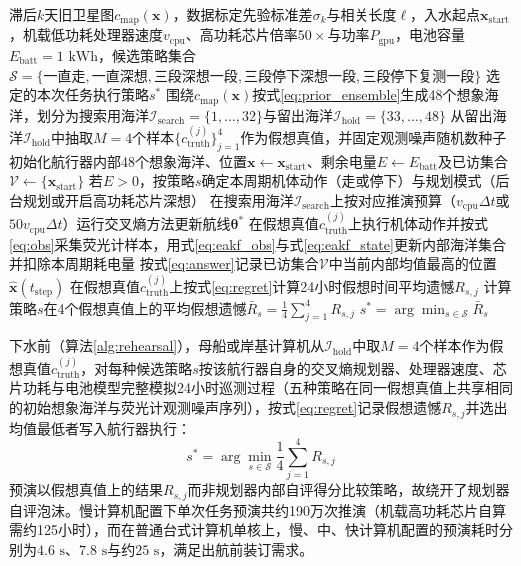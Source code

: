 \begin{algorithm}[htbp]
  \caption{基于数据标定留出想象海洋的出发前全任务预演}
  \label{alg:rehearsal}
  \begin{algorithmic}[1]
    \Require 滞后$k$天旧卫星图$c_{\text{map}}(\mathbf{x})$，数据标定先验标准差$\sigma_k$与相关长度$\ell$，入水起点$\mathbf{x}_{\text{start}}$，机载低功耗处理器速度$v_{\text{cpu}}$、高功耗芯片倍率$50\times$与功率$P_{\text{gpu}}$，电池容量$E_{\text{batt}}=1\text{ kWh}$，候选策略集合$\mathcal{S}=\{\text{一直走}, \text{一直深想}, \text{三段深想一段}, \text{三段停下深想一段}, \text{三段停下复测一段}\}$
    \Ensure 选定的本次任务执行策略$s^*$
    \State 围绕$c_{\text{map}}(\mathbf{x})$按式\eqref{eq:prior_ensemble}生成48个想象海洋，划分为搜索用海洋$\mathcal{I}_{\text{search}}=\{1,\dots,32\}$与留出海洋$\mathcal{I}_{\text{hold}}=\{33,\dots,48\}$
    \State 从留出海洋$\mathcal{I}_{\text{hold}}$中抽取$M=4$个样本$\{c_{\text{truth}}^{(j)}\}_{j=1}^4$作为假想真值，并固定观测噪声随机数种子
        \State 初始化航行器内部48个想象海洋、位置$\mathbf{x} \leftarrow \mathbf{x}_{\text{start}}$、剩余电量$E \leftarrow E_{\text{batt}}$及已访集合$\mathcal{V} \leftarrow \{\mathbf{x}_{\text{start}}\}$
          \State 若$E > 0$，按策略$s$确定本周期机体动作（走或停下）与规划模式（后台规划或开启高功耗芯片深想）
          \State 在搜索用海洋$\mathcal{I}_{\text{search}}$上按对应推演预算（$v_{\text{cpu}}\Delta t$或$50 v_{\text{cpu}}\Delta t$）运行交叉熵方法更新航线$\bm{\theta}^*$
          \State 在假想真值$c_{\text{truth}}^{(j)}$上执行机体动作并按式\eqref{eq:obs}采集荧光计样本，用式\eqref{eq:eakf_obs}与式\eqref{eq:eakf_state}更新内部海洋集合并扣除本周期耗电量
          \State 按式\eqref{eq:answer}记录已访集合$\mathcal{V}$中当前内部均值最高的位置$\hat{\mathbf{x}}(t_{\text{step}})$
        \EndFor
        \State 在假想真值$c_{\text{truth}}^{(j)}$上按式\eqref{eq:regret}计算24小时假想时间平均遗憾$R_{s,j}$
      \EndFor
      \State 计算策略$s$在4个假想真值上的平均假想遗憾$\bar{R}_s = \frac{1}{4}\sum_{j=1}^4 R_{s,j}$
    \EndFor
    \State \Return $s^* = \arg\min_{s\in\mathcal{S}} \bar{R}_s$
  \end{algorithmic}
\end{algorithm}

下水前（算法\ref{alg:rehearsal}），母船或岸基计算机从$\mathcal{I}_{\text{hold}}$中取$M=4$个样本作为假想真值$c_{\text{truth}}^{(j)}$，对每种候选策略$s$按该航行器自身的交叉熵规划器、处理器速度、芯片功耗与电池模型完整模拟24小时巡测过程（五种策略在同一假想真值上共享相同的初始想象海洋与荧光计观测噪声序列），按式\eqref{eq:regret}记录假想遗憾$R_{s,j}$并选出均值最低者写入航行器执行：
\begin{equation}
  s^* = \arg\min_{s\in\mathcal{S}} \frac{1}{4}\sum_{j=1}^4 R_{s,j}
  \label{eq:rehearsal_select}
\end{equation}
预演以假想真值上的结果$R_{s,j}$而非规划器内部自评得分比较策略，故绕开了规划器自评泡沫。慢计算机配置下单次任务预演共约190万次推演（机载高功耗芯片自算需约125小时），而在普通台式计算机单核上，慢、中、快计算机配置的预演耗时分别为$4.6\text{ s}$、$7.8\text{ s}$与约$25\text{ s}$，满足出航前装订需求。

